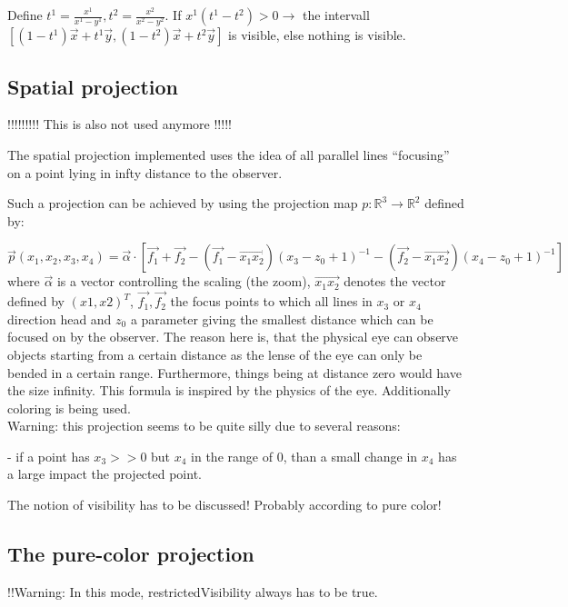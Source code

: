 \documentclass[titlepage]{scrartcl}
\begin{document}
Define $t^1 = \frac{x^1}{x^1 - y^1}, t^2 = \frac{x^2}{x^2 - y^2}$. If $x^1 (t^1 - t^2) > 0 \rightarrow $ the intervall $[(1 - t^1) \vec{x} + t^1 \vec{y}, (1 - t^2) \vec{x} + t^2 \vec{y}]$ is visible, else nothing is visible. 

\subsection{Spatial projection}

!!!!!!!!! This is also not used anymore !!!!!

The spatial projection implemented uses the idea of all parallel lines \enquote{focusing} on a point lying in infty distance to the observer. 

Such a projection can be achieved by using the projection map $p : \mathbb{R}^3 \to \mathbb{R}^2$ defined by: 

\begin{equation}
\vec{p}(x_1, x_2, x_3, x_4) = \vec{\alpha} \cdot [\vec{f_1} + \vec{f_2} - (\vec{f_1} - \vec{x_1x_2}) (x_3 - z_0 + 1)^{-1} - (\vec{f_2} - \vec{x_1x_2}) (x_4 - z_0 + 1)^{-1}]
\end{equation}
where $\vec{\alpha}$ is a vector controlling the scaling (the zoom), $\vec{x_1 x_2}$ denotes the vector defined by $(x1, x2)^T$, $\vec{f_1}, \vec{f_2}$ the focus points to which all lines in $x_3$ or $x_4$ direction head and $z_0$ a parameter giving the smallest distance which can be focused on by the observer. 
The reason here is, that the physical eye can observe objects starting from a certain distance as the lense of the eye can only be bended in a certain range. Furthermore, things being at distance zero would have the size infinity. 
This formula is inspired by the physics of the eye. 
Additionally coloring is being used. \\

Warning: this projection seems to be quite silly due to several reasons: 

- if a point has $x_3 >> 0$ but $x_4$ in the range of 0, than a small change in $x_4$ has a large impact the projected point. 

The notion of visibility has to be discussed! Probably according to pure color!

\subsection{The pure-color projection}

!!Warning: In this mode, restrictedVisibility always has to be true. 
\newline
\end{document}
